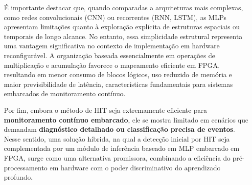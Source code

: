 É importante destacar que, quando comparadas a arquiteturas mais complexas,
como redes convolucionais (CNN) ou recorrentes (RNN, LSTM), as MLPs apresentam
limitações quanto à exploração explícita de estruturas espaciais ou temporais
de longo alcance. No entanto, essa simplicidade estrutural representa uma
vantagem significativa no contexto de implementação em hardware
reconfigurável. A organização baseada essencialmente em operações de
multiplicação e acumulação favorece o mapeamento eficiente em FPGA, resultando
em menor consumo de blocos lógicos, uso reduzido de memória e maior
previsibilidade de latência, características fundamentais para sistemas
embarcados de monitoramento contínuo.

Por fim, embora o método de HIT seja extremamente eficiente para
\textbf{monitoramento contínuo embarcado}, ele se mostra limitado em cenários que
demandam \textbf{diagnóstico detalhado ou classificação precisa de eventos}.
Nesse sentido, uma solução híbrida, na qual a detecção inicial por HIT seja
complementada por um módulo de inferência baseado em MLP embarcado em FPGA,
surge como uma alternativa promissora, combinando a eficiência do
pré-processamento em hardware com o poder discriminativo do aprendizado
profundo.


%
%
%

